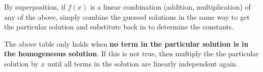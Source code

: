 \documentclass[11pt]{article}
\begin{document}
		By superposition, if $f(x)$ is a linear combination (addition, multiplication) of any of the above, simply combine the guessed solutions in the same way to get the particular solution and substitute back in to determine the constants.
		
		The above table only holds when \textbf{no term in the particular solution is in the homogeneous solution}. If this is not true, then multiply the the particular solution by $x$ until all terms in the solution are linearly independent again.

%		
%		


\end{document}
